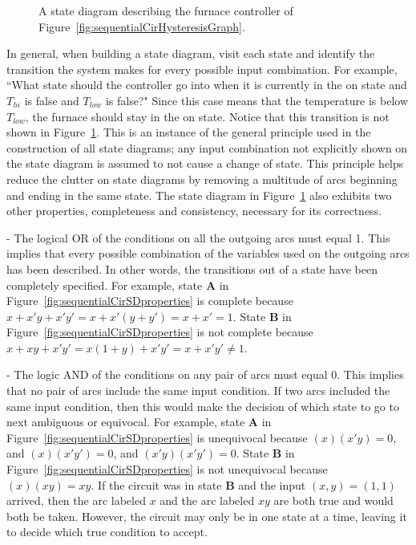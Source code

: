 \begin{figure}[ht]
\caption{A state diagram describing the furnace controller of
Figure~\ref{fig:sequentialCirHysteresisGraph}.}
\label{fig:sequentialCirHysteresisSD}
\end{figure}

In general, when building a state diagram, visit each state
and identify the transition the system makes for every possible 
input combination.  For example, ``What state should the controller go into 
when it is currently in the on state and $T_{hi}$ is false and $T_{low}$ is 
false?" Since this case means that the temperature is below $T_{low}$, 
the furnace should stay in the on state.  Notice that this 
transition is not shown in Figure~\ref{fig:sequentialCirHysteresisSD}.  This is an 
instance of the general principle used in the construction of all state 
diagrams; any input combination not explicitly shown on the state diagram 
is assumed to not cause a change of state. This principle helps reduce the 
clutter on state diagrams by removing a multitude of arcs beginning and ending
in the same state.  The state diagram in Figure~\ref{fig:sequentialCirHysteresisSD} also
exhibits two other properties, completeness and consistency, necessary
for its correctness.

\begin{description}
\label{page:completeness}
\item[Completeness] - The logical OR of the conditions on all the outgoing
arcs must equal 1.  This implies that every possible combination of the 
variables used on the outgoing arcs has been described.  In other words,
the transitions out of a state have been completely specified.  For 
example, state \textbf{ A} in Figure~\ref{fig:sequentialCirSDproperties} 
is complete because $x + x'y + x'y' = x + x'(y+y') = x + x' = 1$.  State 
\textbf{ B} in Figure~\ref{fig:sequentialCirSDproperties} is not complete because 
$x + xy + x'y' = x(1+y) + x'y' = x + x'y' \ne 1$.

\item[Unequivocal] - The logic AND of the conditions on any pair of arcs
must equal 0.  This implies that no pair of arcs include the same input
condition.  If two arcs included the same input condition, then
this would make the decision of which state to go to next ambiguous or
equivocal.  For example, state \textbf{ A} in Figure~\ref{fig:sequentialCirSDproperties}
is unequivocal because $(x)(x'y) = 0$, and $(x)(x'y')=0$, and
$(x'y)(x'y') = 0$.  State \textbf{ B} in Figure~\ref{fig:sequentialCirSDproperties} is not
unequivocal because $(x)(xy) = xy$.  If the circuit was in state \textbf{ B} and 
the input $(x,y)=(1,1)$ arrived, then the arc labeled $x$ and the arc
labeled $xy$ are both true and would both be taken.  However, the
circuit may only be in one state at a time, leaving it to decide which
true condition to accept.
\end{description}

